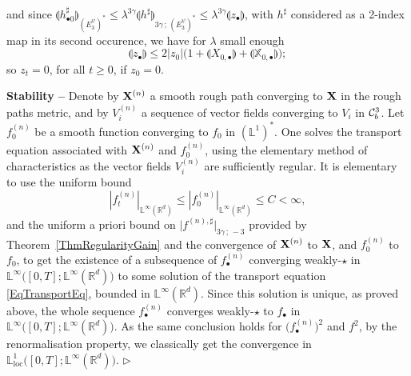 \documentclass[11pt,a4paper]{amsart}
\newcommand{\RR}{\mathbb{R}}  \newcommand{\CC}{\mathbb{C}}  \newcommand{\LL}{\mathbb{L}}  \newcommand{\WW}{\mathbb{W}}
\renewcommand{\leq}{\leqslant}
\numberwithin{equation}{section} %
\newenvironment{Dem}{%
    \begin{list}{\hspace{0.5cm}{\sc Proof --}}{%
        \setlength{\topsep}{0pt}%
        \setlength{\leftmargin}{0pt}%
        \setlength{\rightmargin}{0pt}%
        \setlength{\listparindent}{0pt}%
        \setlength{\itemindent}{0pt}%
        \setlength{\parsep}{0pt}%
        \addtolength{\leftmargin}{20pt}%
        \addtolength{\rightmargin}{0pt}%
    } \item }{\hfill{\space $\rhd$}\end{list}\smallskip}
\begin{document}
\begin{Dem}
$$$$
and since $  \llparenthesis h^\sharp_{\bullet 0} \rrparenthesis_{(E_3^\psi)^*} \leq \lambda^{3\gamma} \llparenthesis h^\sharp \rrparenthesis_{3\gamma\,;\,(E_3^\psi)^*} \leq \lambda^{3\gamma}  \llparenthesis z_\bullet \rrparenthesis$, with $h^\sharp$ considered as a 2-index map in its second occurence, we have for $\lambda$ small enough
\begin{equation}
\label{EqGronwall}
\llparenthesis z_\bullet \rrparenthesis \leq 2 |z_0| \big(1+ \llparenthesis X_{0, \bullet} \rrparenthesis+ \llparenthesis \mathbb{X}_{0, \bullet} \rrparenthesis\big);
\end{equation}
so $z_t = 0$, for all $t\ge 0$, if $z_0 = 0$.

\bigskip
  
{\bf Stability --} Denote by ${{\bf X}}^{(n)}$ a smooth rough path converging to ${\bf X}$ in the rough paths metric, and by $V^{(n)}_i$ a sequence of vector fields converging to $V_i$ in $\mathcal{C}^3_b$. Let $f^{(n)}_0$ be a smooth function converging to $f_0$ in $(\LL^1)^*$. One solves the transport equation associated with ${{\bf X}}^{(n)}$ and $f^{(n)}_0$, using the elementary method of characteristics as the vector fields $V^{(n)}_i$ are sufficiently regular. It is elementary to use the uniform bound
$$
\left|f^{(n)}_t\right|_{\LL^\infty(\RR^d)} \leq \left|f^{(n)}_0\right|_{\LL^\infty(\RR^d)} \leq C<\infty,
$$ 
and the uniform a priori bound on $\big|f^{(n),\sharp}\big|_{3\gamma\,;\,-3}$ provided by Theorem~\ref{ThmRegularityGain} and the convergence of ${{\bf X}}^{(n)}$ to ${\bf X}$, and $f^{(n)}_0$ to $f_0$, to get the existence of a subsequence of $f^{(n)}_\bullet$ converging weakly-$\star$ in $\LL^\infty\big([0,T];\LL^\infty(\RR^d)\big)$ to some solution of the transport equation \eqref{EqTransportEq}, bounded in $\LL^\infty(\RR^d)$. Since this solution is unique, as proved above, the whole sequence $f^{(n)}_\bullet$ converges weakly-$\star$ to $f_\bullet$ in $\LL^\infty\big([0,T];\LL^\infty(\RR^d)\big)$. As the same conclusion holds for $\Big(f^{(n)}_\bullet\Big)^2$ and $f^2$, by the renormalisation property, we classically get the convergence in $\LL^1_\textrm{loc}\big([0,T];\LL^\infty(\RR^d)\big)$.
\end{Dem}

\bigskip
\end{document}
